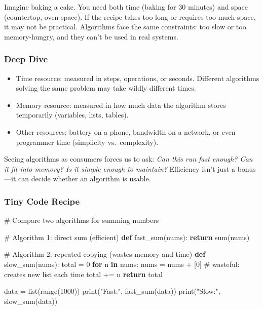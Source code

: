 \documentclass[
  letterpaper,
  DIV=11,
  numbers=noendperiod]{scrreprt}
\newenvironment{Shaded}{\begin{snugshade}}{\end{snugshade}}
\newcommand{\BuiltInTok}[1]{\textcolor[rgb]{0.00,0.23,0.31}{#1}}
\newcommand{\CommentTok}[1]{\textcolor[rgb]{0.37,0.37,0.37}{#1}}
\newcommand{\ControlFlowTok}[1]{\textcolor[rgb]{0.00,0.23,0.31}{\textbf{#1}}}
\newcommand{\DecValTok}[1]{\textcolor[rgb]{0.68,0.00,0.00}{#1}}
\newcommand{\KeywordTok}[1]{\textcolor[rgb]{0.00,0.23,0.31}{\textbf{#1}}}
\newcommand{\NormalTok}[1]{\textcolor[rgb]{0.00,0.23,0.31}{#1}}
\newcommand{\OperatorTok}[1]{\textcolor[rgb]{0.37,0.37,0.37}{#1}}
\newcommand{\StringTok}[1]{\textcolor[rgb]{0.13,0.47,0.30}{#1}}
\providecommand{\tightlist}{%
  \setlength{\itemsep}{0pt}\setlength{\parskip}{0pt}}
\begin{document}
Imagine baking a cake. You need both time (baking for 30 minutes) and
space (countertop, oven space). If the recipe takes too long or requires
too much space, it may not be practical. Algorithms face the same
constraints: too slow or too memory-hungry, and they can't be used in
real systems.

\subsubsection{Deep Dive}\label{deep-dive-41}

\begin{itemize}
\tightlist
\item
  Time resource: measured in steps, operations, or seconds. Different
  algorithms solving the same problem may take wildly different times.
\item
  Memory resource: measured in how much data the algorithm stores
  temporarily (variables, lists, tables).
\item
  Other resources: battery on a phone, bandwidth on a network, or even
  programmer time (simplicity vs.~complexity).
\end{itemize}

Seeing algorithms as consumers forces us to ask: \emph{Can this run fast
enough? Can it fit into memory? Is it simple enough to maintain?}
Efficiency isn't just a bonus---it can decide whether an algorithm is
usable.

\subsubsection{Tiny Code Recipe}\label{tiny-code-recipe-69}

\begin{Shaded}
\begin{Highlighting}[]
\CommentTok{\# Compare two algorithms for summing numbers}

\CommentTok{\# Algorithm 1: direct sum (efficient)}
\KeywordTok{def}\NormalTok{ fast\_sum(nums):}
    \ControlFlowTok{return} \BuiltInTok{sum}\NormalTok{(nums)}

\CommentTok{\# Algorithm 2: repeated copying (wastes memory and time)}
\KeywordTok{def}\NormalTok{ slow\_sum(nums):}
\NormalTok{    total }\OperatorTok{=} \DecValTok{0}
    \ControlFlowTok{for}\NormalTok{ n }\KeywordTok{in}\NormalTok{ nums:}
\NormalTok{        nums }\OperatorTok{=}\NormalTok{ nums }\OperatorTok{+}\NormalTok{ [}\DecValTok{0}\NormalTok{]  }\CommentTok{\# wasteful: creates new list each time}
\NormalTok{        total }\OperatorTok{+=}\NormalTok{ n}
    \ControlFlowTok{return}\NormalTok{ total}

\NormalTok{data }\OperatorTok{=} \BuiltInTok{list}\NormalTok{(}\BuiltInTok{range}\NormalTok{(}\DecValTok{1000}\NormalTok{))}
\BuiltInTok{print}\NormalTok{(}\StringTok{"Fast:"}\NormalTok{, fast\_sum(data))}
\BuiltInTok{print}\NormalTok{(}\StringTok{"Slow:"}\NormalTok{, slow\_sum(data))}
\end{Highlighting}
\end{Shaded}
\end{document}
